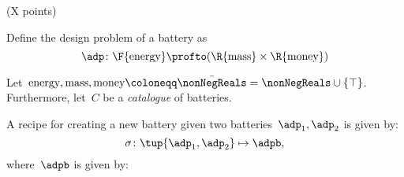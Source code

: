 \documentclass[paper=8.125in:10.250in,pagesize=pdftex,
    headinclude=false,footinclude=false,oneside,egregdoesnotlikesansseriftitles]{kaobook}
\begin{document}

\newpage


\begin{gradedexercise}\label{ex:BatteryDP} (X points)

\newcommand{\energy}{\text{energy}}
\newcommand{\mass}{\text{mass}}
\newcommand{\money}{\text{money}}

Define the design problem of a battery as
    \begin{equation}
        \adp \colon \F{\energy}\profto (\R{\mass}\times \R{\money})
    \end{equation}
    \begin{center}
    \end{center}
Let~$\energy,\mass,\money\coloneqq \bar{\nonNegReals}=\nonNegReals \cup \{\top\}$. Furthermore, let~$C$ be a \emph{catalogue} of batteries.

A recipe for creating a new battery given two batteries~$\adp_1,\adp_2$ is given by:
    \begin{equation*}
        \sigma\colon \tup{\adp_1,\adp_2}\mapsto \adpb,
    \end{equation*}
where~$\adpb$ is given by:


\end{gradedexercise}
\end{document}
